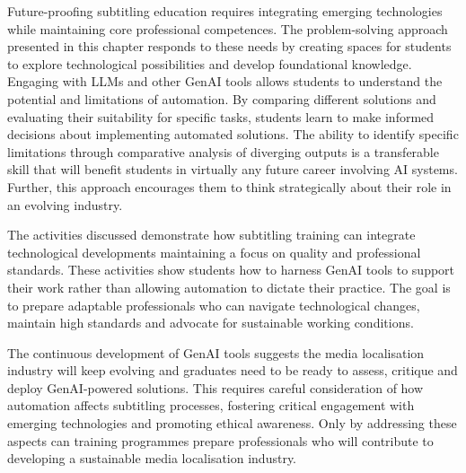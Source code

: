 \documentclass[output=paper]{langscibook}
\begin{document}
Future-proofing subtitling education requires integrating emerging technologies while maintaining core professional competences. The problem-solving approach presented in this chapter responds to these needs by creating spaces for students to explore technological possibilities and develop foundational knowledge. Engaging with LLMs and other GenAI tools allows students to understand the potential and limitations of automation. By comparing different solutions and evaluating their suitability for specific tasks, students learn to make informed decisions about implementing automated solutions. The ability to identify specific limitations through comparative analysis of diverging outputs is a transferable skill that will benefit students in virtually any future career involving AI systems. Further, this approach encourages them to think strategically about their role in an evolving industry.

The activities discussed demonstrate how subtitling training can integrate technological developments maintaining a focus on quality and professional standards. These activities show students how to harness GenAI tools to support their work rather than allowing automation to dictate their practice. The goal is to prepare adaptable professionals who can navigate technological changes, maintain high standards and advocate for sustainable working conditions.

The continuous development of GenAI tools suggests the media localisation industry will keep evolving and graduates need to be ready to assess, critique and deploy GenAI-powered solutions. This requires careful consideration of how automation affects subtitling processes, fostering critical engagement with emerging technologies and promoting ethical awareness. Only by addressing these aspects can training programmes prepare professionals who will contribute to developing a sustainable media localisation industry.

\sloppy\printbibliography[heading=subbibliography,notkeyword=this]
\end{document}
